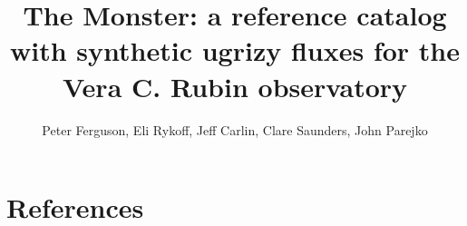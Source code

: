 \documentclass[DM,authoryear,toc]{lsstdoc}
\title{The Monster: a reference catalog with synthetic ugrizy fluxes for the Vera C. Rubin observatory}
\author{%
Peter Ferguson,
Eli Rykoff,
Jeff Carlin, 
Clare Saunders, 
John Parejko
}
\date{\vcsDate}
\begin{document}
\maketitle


\section{References} \label{sec:bib}
\renewcommand{\refname}{} %


%
\end{document}
